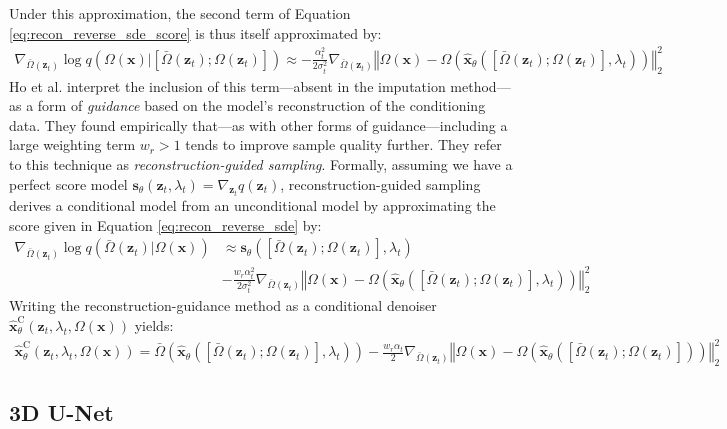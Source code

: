 \documentclass[ oneside,%
                    author={George Herbert},
                    degree={MSci},
                     title={Diffusion Models for Time-Evolving Precipitation Fields},
                  subtitle={}]{dissertation}
\begin{document}
Under this approximation, the second term of Equation \ref{eq:recon_reverse_sde_score} is thus itself approximated by:
\begin{align}
      \nabla_{\bar\Omega(\mathbf{z}_t)} \log q(\Omega(\mathbf{x})|[\bar\Omega(\mathbf{z}_t); \Omega(\mathbf{z}_t)])\approx-\frac{\alpha_t^2}{2\sigma_t^2}\nabla_{\bar\Omega(\mathbf{z}_t)} \left\Vert \Omega(\mathbf{x}) - \Omega\left(\hat{\mathbf{x}}_\theta\left([\bar\Omega(\mathbf{z}_t); \Omega(\mathbf{z}_t)], \lambda_t \right)\right)\right\Vert_2^2
\end{align}
Ho et al. \cite{VDM_Ho} interpret the inclusion of this term---absent in the imputation method---as a form of \textit{guidance} based on the model's reconstruction of the conditioning data. They found empirically that---as with other forms of guidance---including a large weighting term $w_r>1$ tends to improve sample quality further. They refer to this technique as \textit{reconstruction-guided sampling}. Formally, assuming we have a perfect score model $\mathbf{s}_\theta(\mathbf{z}_t, \lambda_t)=\nabla_{\mathbf{z}_t} q(\mathbf{z}_t)$, reconstruction-guided sampling derives a conditional model from an unconditional model by approximating the score given in Equation \ref{eq:recon_reverse_sde} by:
\begin{align}
      \nabla_{\bar\Omega(\mathbf{z}_t)}\log q(\bar\Omega(\mathbf{z}_t)|\Omega(\mathbf{x}))&\approx \mathbf{s}_\theta ([\bar\Omega(\mathbf{z}_t); \Omega(\mathbf{z}_t)], \lambda_t)\\&-\frac{w_r\alpha_t^2}{2\sigma_t^2}\nabla_{\bar\Omega(\mathbf{z}_t)} \left\Vert \Omega(\mathbf{x}) - \Omega\left(\hat{\mathbf{x}}_\theta\left([\bar\Omega(\mathbf{z}_t); \Omega(\mathbf{z}_t)], \lambda_t \right)\right)\right\Vert_2^2
\end{align}
Writing the reconstruction-guidance method as a conditional denoiser $\hat{\mathbf{x}}^{\mathrm{C}}_\theta(\mathbf{z}_t, \lambda_t, \Omega(\mathbf{x}))$ yields:
\begin{align}
      \hat{\mathbf{x}}^{\mathrm{C}}_\theta(\mathbf{z}_t, \lambda_t, \Omega(\mathbf{x}))=\bar\Omega\left(\hat{\mathbf{x}}_\theta([\bar\Omega(\mathbf{z}_t); \Omega(\mathbf{z}_t)], \lambda_t )\right) - \frac{w_r\alpha_t}{2}\nabla_{\bar\Omega(\mathbf{z}_t)} \left\Vert \Omega(\mathbf{x}) - \Omega\left(\hat{\mathbf{x}}_\theta\left([\bar\Omega(\mathbf{z}_t); \Omega(\mathbf{z}_t)]\right)\right)\right\Vert_2^2
\end{align}

\subsection{3D U-Net}
\label{sec:background_unet}
\end{document}
